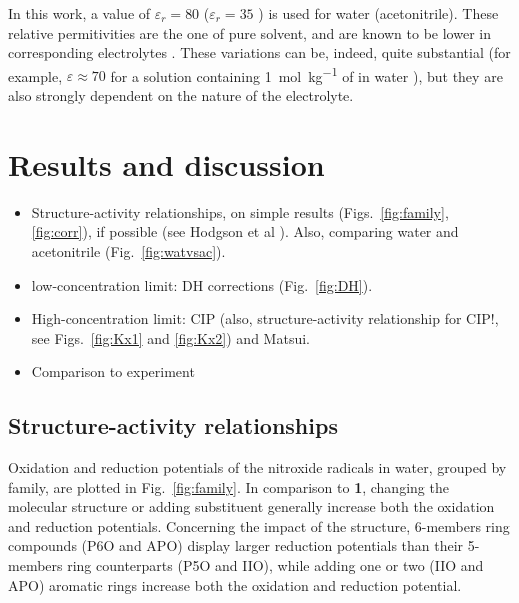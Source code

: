 \documentclass[review]{elsarticle}
\begin{document}
In this work, a value of $\varepsilon_r=80$ ($\varepsilon_r=35$ ) is used for water (acetonitrile). These relative permitivities are the one of pure solvent, and are known to be lower in corresponding electrolytes \cite{silvaTrueHuckelEquation2022}. These variations can be, indeed, quite substantial (for example, $\varepsilon\approx 70$ for a solution containing \SI{1}{\mol\per\kilo\gram} of  in water \cite{kontogeorgisDebyeHuckelTheoryIts2018,silvaTrueHuckelEquation2022}), but they are also strongly dependent on the nature of the electrolyte.

\section{Results and discussion}

\begin{itemize}
	\item Structure-activity relationships, on simple results (Figs.~\ref{fig:family}, \ref{fig:corr}), if possible (see Hodgson et al \cite{hodgsonOneElectronOxidationReduction2007}). Also, comparing water and acetonitrile (Fig.~\ref{fig:watvsac}).
	\item low-concentration limit: DH corrections (Fig.~\ref{fig:DH}).
	\item High-concentration limit: CIP (also, structure-activity relationship for CIP!, see Figs.~\ref{fig:Kx1} and \ref{fig:Kx2}) and Matsui.
	\item Comparison to experiment
\end{itemize}

\subsection{Structure-activity relationships}

Oxidation and reduction potentials of the nitroxide radicals in water, grouped by family, are plotted in Fig.~\ref{fig:family}. In comparison to \textbf{1}, changing the molecular structure or adding substituent generally increase both the oxidation and reduction potentials. Concerning the impact of the structure, 6-members ring compounds (P6O and APO)  display larger reduction potentials than their 5-members ring counterparts (P5O and  IIO), while adding one or two (IIO and APO) aromatic rings increase both the oxidation and reduction potential. 
\end{document}
